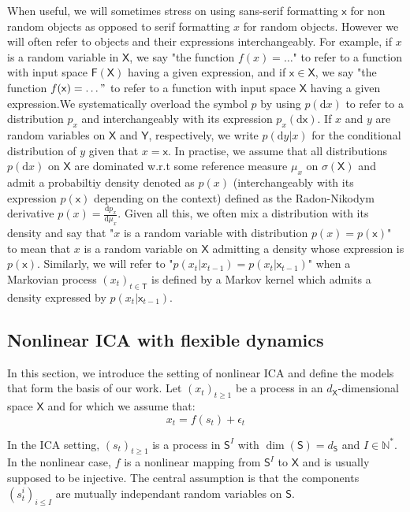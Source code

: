 \documentclass{article}
\newcommand{\1}{\mathbbm{1}}
\newcommand{\rmd}{\ensuremath{\mathrm{d}}}
\newcounter{example}[section]
\begin{document}
When useful, we will sometimes stress on using sans-serif formatting $\mathsf{x}$ for non random objects as opposed to serif formatting $x$ for random objects. However we will often refer to objects and their expressions interchangeably. For example, if $x$ is a random variable in $\mathsf{X}$, we say "the function $f(x) = \ldots $" to refer to a function with input space $\mathsf{F(X)}$ having a given expression, and if $\mathsf{x} \in \mathsf{X}$, we say "the function $f(\mathsf{x}) = \ldots"$ to refer to a function with input space $\mathsf{X}$ having a given expression.We systematically overload the symbol $p$ by using $p(\rmd x)$ to refer to a distribution $p_x$ and interchangeably with its expression $p_x(\mathsf{\rmd x})$. If $x$ and $y$ are random variables on $\mathsf{X}$ and $\mathsf{Y}$, respectively, we write $p(\rmd y|x)$ for the conditional distribution of $y$ given that $x = \mathsf{x}$. In practise, we assume that all distributions $p(\rmd x)$ on $\mathsf{X}$ are dominated w.r.t some reference measure $\mu_x$ on $\sigma(\mathsf{X})$ and admit a probabiltiy density denoted as $p(x)$ (interchangeably with its expression $p(\mathsf{x})$ depending on the context) defined as the Radon-Nikodym derivative $p(x) = \frac{\rmd p_x}{\rmd \mu_x}$. Given all this, we often mix a distribution with its density and say that "$x$ is a random variable with distribution $p(x) = p(\mathsf{x})$" to mean that $x$ is a random variable on $\mathsf{X}$ admitting a density whose expression is $p(\mathsf{x})$. Similarly, we will refer to "$p(x_t|x_{t-1}) = p(x_t|\mathsf{x}_{t-1})$" when a Markovian process $(x_t)_{t \in \mathsf{T}}$ is defined by a Markov kernel which admits a density expressed by $p(x_t|\mathsf{x}_{t-1})$.



\subsection{Nonlinear ICA with flexible dynamics}\label{nonlinear_ica}

In this section, we introduce the setting of nonlinear ICA and define the models that form the basis of our work. Let $(x_t)_{t \geq 1}$ be a process in an $d_\mathsf{X}$-dimensional space $\mathsf{X}$ and for which we assume that:
$$x_t = f(s_t) + \epsilon_t$$

In the ICA setting, $(s_t)_{t \geq 1}$ is a process in $\mathsf{S}^I$ with $\dim(\mathsf{S}) = d_\mathsf{S}$ and $I \in \mathbb{N}^{*}$. In the nonlinear case, $f$ is a nonlinear mapping from $\mathsf{S}^I$ to $\mathsf{X}$ and is usually supposed to be injective. The central assumption is that the components $(s_t^i)_{i \leq I}$ are mutually independant random variables on $\mathsf{S}$.
\end{document}

